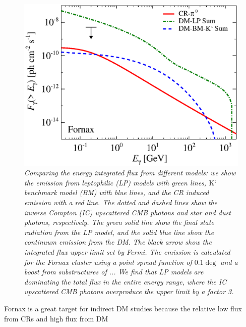 \documentclass[10pt,aps,pra,reprint,amsmath,amsfonts,amssymb,showpacs]{revtex4-1}
\newcommand{\rmn}{\mathrm}
\newcommand{\Kp}{\rmn{K}`}
\begin{document}
\begin{figure}
 \includegraphics[width=0.99\columnwidth]{figures/flux.int.v9.0.1deg.1.6T.SubMass.SF300.IR2.noMW.woGal.eps}
\caption{\it Comparing the energy integrated flux from different
  models: we show the emission from leptophilic (LP) models with green
  lines, $\Kp$ benchmark model (BM) with blue lines, and the CR
  induced emission with a red line. The dotted and dashed lines show
  the inverse Compton (IC) upscattered CMB photons and star and dust
  photons, respectively. The green solid line show the final state
  radiation from the LP model, and the solid blue line show the
  continuum emission from the DM. The black arrow show the integrated
  flux upper limit set by Fermi.  The emission is calculated for the
  Fornax cluster using a point spread function of $0.1\deg$ and a
  boost from substructures of ...  We find that LP models are
  dominating the total flux in the entire energy range, where the IC
  upscattered CMB photons overproduce the upper limit by a factor 3.}
 \label{fig8}
\end{figure}
Fornax is a great target for indirect DM studies because the relative
 low flux from CRs and high flux from DM
\end{document}
